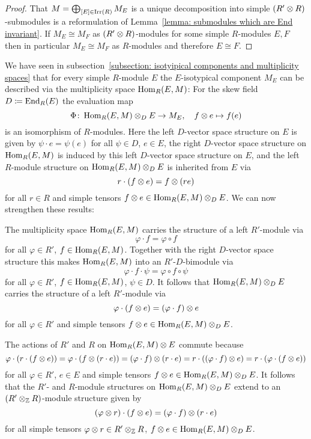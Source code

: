 \begin{proof}
  That $M = \bigoplus_{[E] \in \operatorname{Irr}(R)} M_E$ is a unique decomposition into simple $(R' \mathbin{\otimes} R)$-submodules is a reformulation of Lemma~\ref{lemma: submodules which are End invariant}.
  If $M_E \cong M_F$ as $(R' \mathbin{\otimes} R)$-modules for some simple $R$-modules $E, F$ then in particular $M_E \cong M_F$ as $R$-modules and therefore $E \cong F$.
\end{proof}




\begin{fluff}
  We have seen in subsection~\ref{subsection: isotyipical components and multiplicity spaces} that for every simple $R$-module $E$ the $E$-isotypical component $M_E$ can be described via the multiplicity space $\operatorname{Hom}_R(E,M)$:
  For the skew field $D \coloneqq \operatorname{End}_R(E)$ the evaluation map
  \[
            \Phi
    \colon  \operatorname{Hom}_R(E, M) \mathbin{\otimes}_D E
    \to     M_E,
    \quad   f \mathbin{\otimes} e
    \mapsto f(e)
  \]
  is an isomorphism of $R$-modules.
  Here the left $D$-vector space structure on $E$ is given by $\psi \cdot e = \psi(e)$ for all $\psi \in D$, $e \in E$, the right $D$-vector space structure on $\operatorname{Hom}_R(E,M)$ is induced by this left $D$-vector space structure on $E$, and the left $R$-module structure on $\operatorname{Hom}_R(E,M) \mathbin{\otimes}_D E$ is inherited from $E$ via
  \[
      r \cdot (f \mathbin{\otimes} e)
    = f \mathbin{\otimes} (re)
  \]
  for all $r \in R$ and simple tensors $f \mathbin{\otimes} e \in \operatorname{Hom}_R(E,M) \mathbin{\otimes}_D E$.
  We can now strengthen these results:
  
  The multiplicity space $\operatorname{Hom}_R(E,M)$ carries the structure of a left $R'$-module via
  \[
      \varphi \cdot f
    = \varphi \circ f
  \]
  for all $\varphi \in R'$, $f \in \operatorname{Hom}_R(E,M)$.
  Together with the right $D$-vector space structure this makes $\operatorname{Hom}_R(E,M)$ into an $R'$-$D$-bimodule via
  \[
      \varphi \cdot f \cdot \psi
    = \varphi \circ f \circ \psi
  \]
  for all $\varphi \in R'$, $f \in \operatorname{Hom}_R(E,M)$, $\psi \in D$.
  It follows that $\operatorname{Hom}_R(E,M) \mathbin{\otimes}_D E$ carries the structure of a left $R'$-module via
  \[
      \varphi \cdot (f \mathbin{\otimes} e)
    = (\varphi \cdot f) \mathbin{\otimes} e
  \]
  for all $\varphi \in R'$ and simple tensors $f \mathbin{\otimes} e \in \operatorname{Hom}_R(E,M) \mathbin{\otimes}_D E$.
  
  The actions of $R'$ and $R$ on $\operatorname{Hom}_R(E, M) \mathbin{\otimes} E$ commute because
  \[
      \varphi \cdot (r \cdot (f \mathbin{\otimes} e))
    = \varphi \cdot (f \mathbin{\otimes} (r \cdot e))
    = (\varphi \cdot f) \mathbin{\otimes} (r \cdot e)
    = r \cdot ((\varphi \cdot f) \mathbin{\otimes} e)
    = r \cdot (\varphi \cdot (f \mathbin{\otimes} e))
  \]
  for all $\varphi \in R'$, $e \in E$ and simple tensors $f \mathbin{\otimes} e \in \operatorname{Hom}_R(E,M) \mathbin{\otimes}_D E$.
  It follows that the $R'$- and $R$-module structures on $\operatorname{Hom}_R(E,M) \mathbin{\otimes}_D E$ extend to an $(R' \mathbin{\otimes}_{\mathbb{Z}} R)$-module structure given by
  \[
      (\varphi \mathbin{\otimes} r) \cdot (f \mathbin{\otimes} e)
    = (\varphi \cdot f) \mathbin{\otimes} (r \cdot e)
  \]
  for all simple tensors $\varphi \mathbin{\otimes} r \in R' \mathbin{\otimes}_{\mathbb{Z}} R$, $f \mathbin{\otimes} e \in \operatorname{Hom}_R(E,M) \mathbin{\otimes}_D E$.
\end{fluff}


